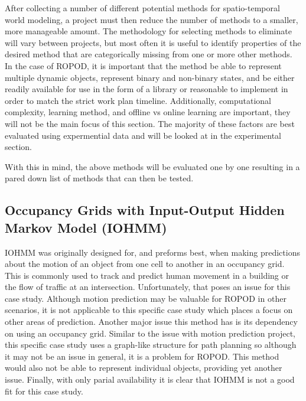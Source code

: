   After collecting a number of different potential methods for spatio-temporal world
  modeling, a project must then reduce the number of methods to a smaller, more
  manageable amount. The methodology for selecting methods to eliminate will
  vary between projects, but most often it is useful to identify properties
  of the desired method that are categorically missing from one or more other
  methods. In the case of ROPOD, it is important that the method be able to
  represent multiple dynamic objects, represent binary and non-binary states,
  and be either readily available for use in the form of a library or reasonable to
  implement in order to match the strict work plan timeline. Additionally,
  computational complexity, learning method, and offline vs online
  learning are important, they will not be the main focus of this section.
  The majority of these factors are best evaluated using expermential data and
  will be looked at in the experimental section.


  With this in mind, the above methods will be
  evaluated one by one resulting in a pared down list of methods that can
  then be tested. \\

  \subsection { Occupancy Grids with Input-Output Hidden Markov Model (IOHMM) }
  IOHMM was originally designed for, and preforms best, when making predictions
  about the motion of an object from one cell to another in an occupancy grid.
  This is commonly used to track and predict human movement in a building or
  the flow of traffic at an intersection.
  Unfortunately, that poses an issue for this case study. Although motion prediction
  may be valuable for ROPOD in other scenarios, it is not applicable to this specific case study
  which places a focus on other areas of prediction.
  Another major issue this method has is its
  dependency on using an occupancy grid. Similar to the issue with motion
  prediction project, this specific case study uses a graph-like structure for path
  planning so although it may not be an issue in general, it is a problem for ROPOD. This method would also not be able to represent individual objects,
  providing yet another issue. Finally, with only parial availability
  it is clear that IOHMM is not a good fit for this case study. \\

